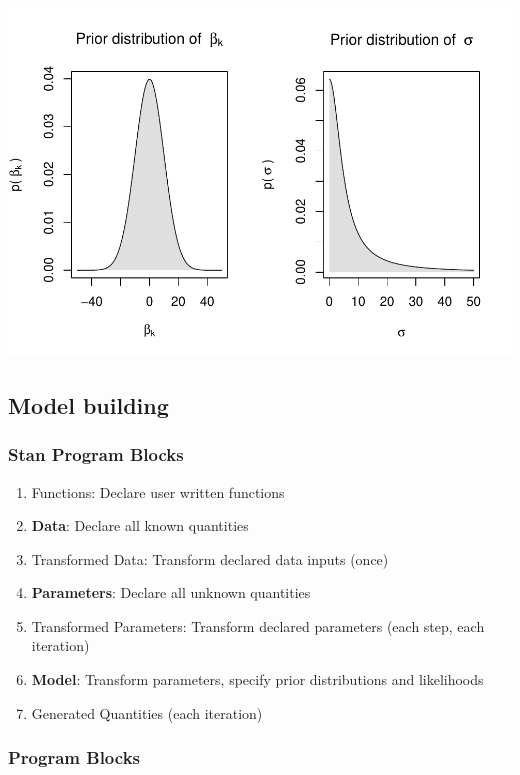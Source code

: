 \documentclass[
  11pt,
]{article}
\providecommand{\tightlist}{%
  \setlength{\itemsep}{0pt}\setlength{\parskip}{0pt}}
\begin{document}
\begin{center}\includegraphics{04-lec_files/figure-latex/prior-viz-1} \end{center}

\hypertarget{model-building}{%
\subsection{Model building}\label{model-building}}

\hypertarget{stan-program-blocks}{%
\subsubsection{Stan Program Blocks}\label{stan-program-blocks}}

\begin{enumerate}
\def\labelenumi{\arabic{enumi}.}
\tightlist
\item
  Functions: Declare user written functions
\item
  \textbf{Data}: Declare all known quantities
\item
  Transformed Data: Transform declared data inputs (once)
\item
  \textbf{Parameters}: Declare all unknown quantities
\item
  Transformed Parameters: Transform declared parameters (each step, each iteration)
\item
  \textbf{Model}: Transform parameters, specify prior distributions and likelihoods
\item
  Generated Quantities (each iteration)
\end{enumerate}

\hypertarget{program-blocks}{%
\subsubsection{Program Blocks}\label{program-blocks}}
\end{document}
